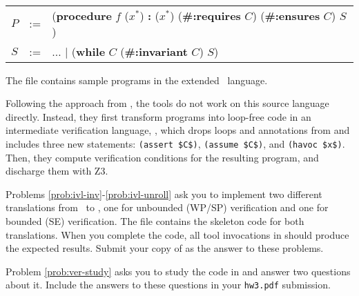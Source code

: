 \documentclass{handout}
\begin{document}
{\tt\small
\begin{tabular}{lcl}
$P$ &:=&  (\textbf{procedure} $f$ ($x^*$) \textbf{:} ($x^*$) (\textbf{\#:requires} $C$)  (\textbf{\#:ensures} $C$) $S$) \\
$S$ &:=&  $\ldots$ $|$  (\textbf{while} $C$ (\textbf{\#:invariant} $C$) $S$) \\
\end{tabular}}

The file  contains sample programs in the extended \imp\
language.

Following  the approach from , the tools do not work on this source
language directly. Instead, they first transform \imp programs into loop-free
code in an intermediate verification language, \ivl, which drops loops and
annotations from \imp and includes three new statements: \lstinline{(assert $C$)},
\lstinline{(assume $C$)}, and \lstinline{(havoc $x$)}. Then, they compute
verification conditions for the resulting program, and discharge them with
Z3.\looseness=-1


Problems \ref{prob:ivl-inv}-\ref{prob:ivl-unroll} ask you to implement two
different translations from \imp\ to \ivl, one for unbounded (WP/SP)
verification and one for bounded (SE) verification. The file 
contains the skeleton code for both translations. When you complete the code,
all tool invocations in \src[imp/]{verified.rkt} should produce the expected
results. Submit your copy of \src[imp/]{ivl.rkt} as the answer to these
problems.

Problem \ref{prob:ver-study} asks you to study the code in 
and answer two questions about it. Include the answers to these questions in
your \texttt{hw3.pdf} submission.
\end{document}
